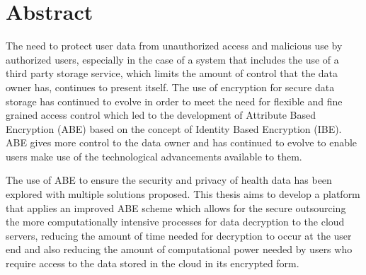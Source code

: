 \chapter*{Abstract}

The need to protect user data from unauthorized access and malicious use by authorized users, especially in the case of a system that includes the use of a third party storage service, which limits the amount of control that the data owner has, continues to present itself. The use of encryption for secure data storage has continued to evolve in order to meet the need for flexible and fine grained access control which led to the development of Attribute Based Encryption (ABE) based on the concept of Identity Based Encryption (IBE). ABE gives more control to the data owner and has continued to evolve to enable users make use of the technological advancements available to them.

The use of ABE to ensure the security and privacy of health data has been explored with multiple solutions proposed. This thesis aims to develop a platform that applies an improved ABE scheme which allows for the secure outsourcing the more computationally intensive processes for data decryption to the cloud servers, reducing the amount of time needed for decryption to occur at the user end and also reducing the amount of computational power needed by users who require access to the data stored in the cloud in its encrypted form.

